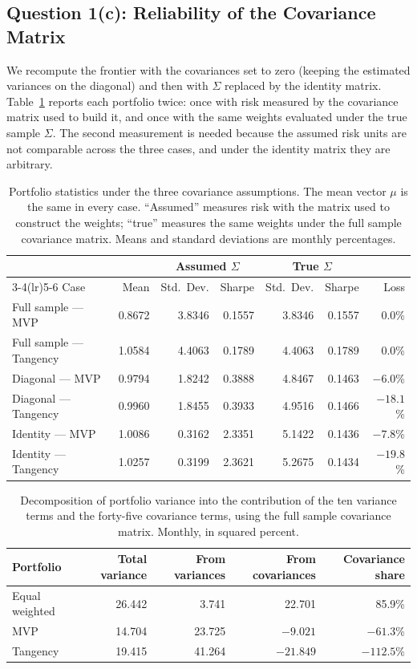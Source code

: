 \documentclass[11pt]{article}
\begin{document}
\subsection{Question 1(c): Reliability of the Covariance Matrix}

We recompute the frontier with the covariances set to zero (keeping the
estimated variances on the diagonal) and then with $\Sigma$ replaced by the
identity matrix. Table~\ref{tab:q1c} reports each portfolio twice: once with
risk measured by the covariance matrix used to build it, and once with the
same weights evaluated under the true sample $\Sigma$. The second measurement
is needed because the assumed risk units are not comparable across the three
cases, and under the identity matrix they are arbitrary.

\begin{table}[H]
\centering
\caption{Portfolio statistics under the three covariance assumptions. The mean
vector $\mu$ is the same in every case. ``Assumed'' measures risk with the
matrix used to construct the weights; ``true'' measures the same weights under
the full sample covariance matrix. Means and standard deviations are monthly
percentages.}
\small
\begin{tabular}{lrrrrrr}
\toprule
 & & \multicolumn{2}{c}{Assumed $\Sigma$} & \multicolumn{2}{c}{True $\Sigma$} & \\
\cmidrule(lr){3-4}\cmidrule(lr){5-6}
Case & Mean & Std.\ Dev. & Sharpe & Std.\ Dev. & Sharpe & Loss \\
\midrule
Full sample --- MVP & 0.8672 & 3.8346 & 0.1557 & 3.8346 & 0.1557 & 0.0\% \\
Full sample --- Tangency & 1.0584 & 4.4063 & 0.1789 & 4.4063 & 0.1789 & 0.0\% \\
Diagonal --- MVP & 0.9794 & 1.8242 & 0.3888 & 4.8467 & 0.1463 & $-6.0$\% \\
Diagonal --- Tangency & 0.9960 & 1.8455 & 0.3933 & 4.9516 & 0.1466 & $-18.1$\% \\
Identity --- MVP & 1.0086 & 0.3162 & 2.3351 & 5.1422 & 0.1436 & $-7.8$\% \\
Identity --- Tangency & 1.0257 & 0.3199 & 2.3621 & 5.2675 & 0.1434 & $-19.8$\% \\
\bottomrule
\end{tabular}
\label{tab:q1c}
\end{table}

\begin{table}[H]
\centering
\caption{Decomposition of portfolio variance into the contribution of the ten
variance terms and the forty-five covariance terms, using the full sample
covariance matrix. Monthly, in squared percent.}
\small
\begin{tabular}{lrrrr}
\toprule
Portfolio & Total variance & From variances & From covariances & Covariance share \\
\midrule
Equal weighted & 26.442 & 3.741 & 22.701 & 85.9\% \\
MVP & 14.704 & 23.725 & $-9.021$ & $-61.3$\% \\
Tangency & 19.415 & 41.264 & $-21.849$ & $-112.5$\% \\
\bottomrule
\end{tabular}
\label{tab:q1c_decomp}
\end{table}
\end{document}
